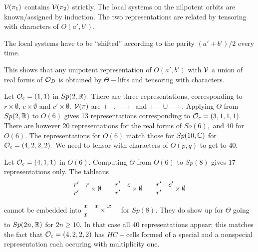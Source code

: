 \documentclass[11pt ,reqno]{amsart}
\begin{document}
${\mathcal V}(\pi_1)$ contains ${\mathcal V}(\pi_2)$ strictly. The local systems on the nilpotent orbits are
known/assigned  by induction. The two representations are related by
tensoring with characters of $O(a',b').$ 

{\clrblu The local systems have to be ``shifted'' according to the
  parity $(a'+b')/2$   every time}.

This shows that any unipotent representation of $O(a',b')$ with ${\mathcal V}$
a union of real forms of ${\mathcal O}_D$ is obtained by $\Theta-$lifts and
tensoring with characters.

\begin{example}
  Let $\mathcal O_c=(1,1)$ in $Sp(2,{\mathbb R}).$ There are three representations,
  corresponding to $r\times\emptyset$, $c\times\emptyset$ and
  $c'\times\emptyset.$ ${\mathcal V}(\pi)$ are $+-,$ $-+$ and $+-\cup-+.$
  Applying $\Theta$ from  $Sp(2,{\mathbb R})$ to $O(6)$  gives 13
  representations corresponding to $\mathcal O_c=(3,1,1,1).$
  There are however 20 representations for the real forms of $So(6),$
  and 40 for $O(6).$  The representations for $O(6)$ match those for
  $Sp(10,{\mathbb C})$ for $\mathcal O_c=(4,2,2,2).$ We need to tensor with
  characters of $O(p,q)$ to get to 40. 
\end{example}
\begin{example}
  Let $\mathcal O_c=(4,1,1)$ in $O(6).$ Computing $\Theta$ from $O(6)$ to
  $Sp(8)$  gives 17 representations only. The tableaus
  $$
  \begin{matrix} r'&r\\r'\end{matrix}\times \begin{matrix} \emptyset\\ \end{matrix}\qquad
\begin{matrix} r'&c\\r'\end{matrix}\times \begin{matrix} \emptyset\\ \end{matrix}\qquad
\begin{matrix} r'&c'\\r'\end{matrix}\times \begin{matrix} \emptyset\\ \end{matrix}
  $$
  cannot be embedded into $\begin{matrix} x&x\\ x\end{matrix}\times \begin{matrix} x&\\ \ &
  \end{matrix}$ for $Sp(8).$ They do show up for $\Theta$ going to $Sp(2n,{\mathbb R})$ for $2n\ge 10.$  In
  that case all 40 representations appear; this matches the fact that
  $\mathcal O_c=(4,2,2,2)$ has $HC-$cells formed of  a special and a nonspecial
  representation each occuring with multiplicity one.
\end{example}
\end{document}
